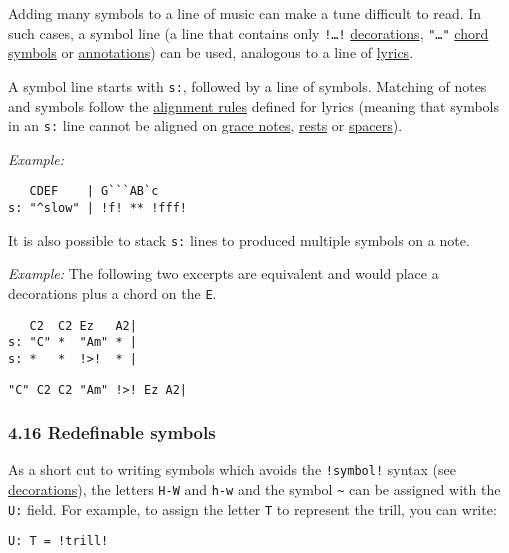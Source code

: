 Adding many symbols to a line of music can make a tune difficult to
read. In such cases, a symbol line (a line that contains only
\texttt{!\ldots{}!} \protect\hyperlink{decorations}{decorations},
\texttt{"\ldots{}"} \protect\hyperlink{chord_symbols}{chord symbols} or
\protect\hyperlink{annotations}{annotations}) can be used, analogous to
a line of \protect\hyperlink{lyrics}{lyrics}.

A symbol line starts with \texttt{s:}, followed by a line of symbols.
Matching of notes and symbols follow the
\protect\hyperlink{alignment}{alignment rules} defined for lyrics
(meaning that symbols in an \texttt{s:} line cannot be aligned on
\protect\hyperlink{grace_notes}{grace notes},
\protect\hyperlink{rests}{rests} or
\protect\hyperlink{typesetting_extra_space}{spacers}).

\emph{Example:}

\begin{verbatim}
   CDEF    | G```AB`c
s: "^slow" | !f! ** !fff!
\end{verbatim}

It is also possible to stack \texttt{s:} lines to produced multiple
symbols on a note.

\emph{Example:} The following two excerpts are equivalent and would
place a decorations plus a chord on the \texttt{E}.

\begin{verbatim}
   C2  C2 Ez   A2|
s: "C" *  "Am" * |
s: *   *  !>!  * |
\end{verbatim}

\begin{verbatim}
"C" C2 C2 "Am" !>! Ez A2|
\end{verbatim}

\hypertarget{redefinable_symbols}{\subsubsection{4.16 Redefinable
symbols}\label{redefinable_symbols}}

As a short cut to writing symbols which avoids the \texttt{!symbol!}
syntax (see \protect\hyperlink{decorations}{decorations}), the letters
\texttt{H-W} and \texttt{h-w} and the symbol \texttt{\textasciitilde{}}
can be assigned with the \texttt{U:} field. For example, to assign the
letter \texttt{T} to represent the trill, you can write:

\begin{verbatim}
U: T = !trill!
\end{verbatim}

